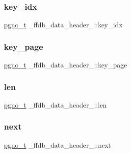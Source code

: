 \subsubsection{\texorpdfstring{key\_idx}{key\_idx}}
{\footnotesize\ttfamily \mbox{\hyperlink{adat-devel_2other__libs_2filedb_2filehash_2ffdb__db_8h_a000813331643d38481142bcce7de1501}{pgno\+\_\+t}} \+\_\+ffdb\+\_\+data\+\_\+header\+\_\+\+::key\+\_\+idx}

\mbox{\label{struct__ffdb__data__header___a91aed66c809924649b60df3bc202f082}} 
\subsubsection{\texorpdfstring{key\_page}{key\_page}}
{\footnotesize\ttfamily \mbox{\hyperlink{adat-devel_2other__libs_2filedb_2filehash_2ffdb__db_8h_a000813331643d38481142bcce7de1501}{pgno\+\_\+t}} \+\_\+ffdb\+\_\+data\+\_\+header\+\_\+\+::key\+\_\+page}

\mbox{\label{struct__ffdb__data__header___ae92f78b964c32a66a889e0f8926f39e9}} 
\subsubsection{\texorpdfstring{len}{len}}
{\footnotesize\ttfamily \mbox{\hyperlink{adat-devel_2other__libs_2filedb_2filehash_2ffdb__db_8h_a000813331643d38481142bcce7de1501}{pgno\+\_\+t}} \+\_\+ffdb\+\_\+data\+\_\+header\+\_\+\+::len}

\mbox{\label{struct__ffdb__data__header___a6eec9d909ab0bdaa5d2290d815f9f90e}} 
\subsubsection{\texorpdfstring{next}{next}}
{\footnotesize\ttfamily \mbox{\hyperlink{adat-devel_2other__libs_2filedb_2filehash_2ffdb__db_8h_a000813331643d38481142bcce7de1501}{pgno\+\_\+t}} \+\_\+ffdb\+\_\+data\+\_\+header\+\_\+\+::next}

